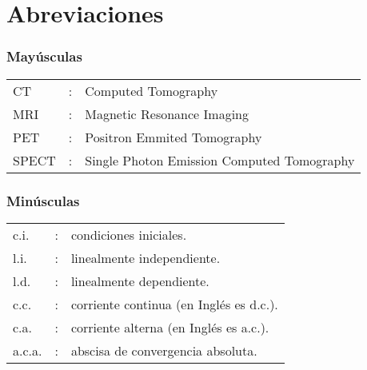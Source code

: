 
\chapter*{Abreviaciones}
{}

\subsection*{Mayúsculas}
\begin{longtable}[l]{lcl}
CT  &:&  Computed Tomography \\
MRI &:& Magnetic Resonance Imaging \\
PET &:& Positron Emmited Tomography \\
SPECT &:& Single Photon Emission Computed Tomography 
\end{longtable}

\subsection*{Minúsculas}
\begin{longtable}[l]{lcl}
c.i. &:& condiciones iniciales. \\
l.i. &:& linealmente independiente. \\
l.d. &:& linealmente dependiente. \\
c.c. &:& corriente continua (en Inglés es d.c.).\\
c.a. &:& corriente alterna (en Inglés es a.c.).\\
a.c.a. &:& abscisa de convergencia absoluta.
\end{longtable}

